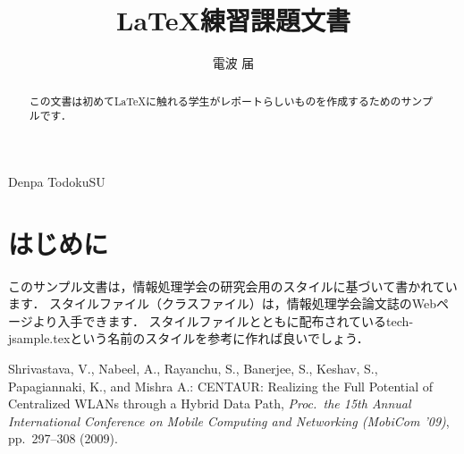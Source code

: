 \documentclass[submit,techrep,noauthor]{ipsj}
\begin{document}
\title{\LaTeX 練習課題文書}
\author{電波 届}{Denpa Todoku}{SU}

\begin{abstract}
  この文書は初めて\LaTeX に触れる学生がレポートらしいものを作成するためのサンプルです．
\end{abstract}

\maketitle

\section{はじめに}

このサンプル文書は，情報処理学会の研究会用のスタイルに基づいて書かれています．
スタイルファイル（クラスファイル）は，情報処理学会論文誌のWebページより入手できます．
スタイルファイルとともに配布されているtech-jsample.texという名前のスタイルを参考に作れば良いでしょう．




\begin{thebibliography}{99}
   Shrivastava, V., Nabeel, A., Rayanchu, S.,
    Banerjee, S., Keshav, S., Papagiannaki, K., and Mishra A.: CENTAUR:
    Realizing the Full Potential of Centralized WLANs through a Hybrid Data
    Path, \textit{Proc.\ the 15th Annual International Conference on Mobile Computing
    and Networking (MobiCom '09)}, pp.~297--308 (2009).


\end{thebibliography}
\end{document}
